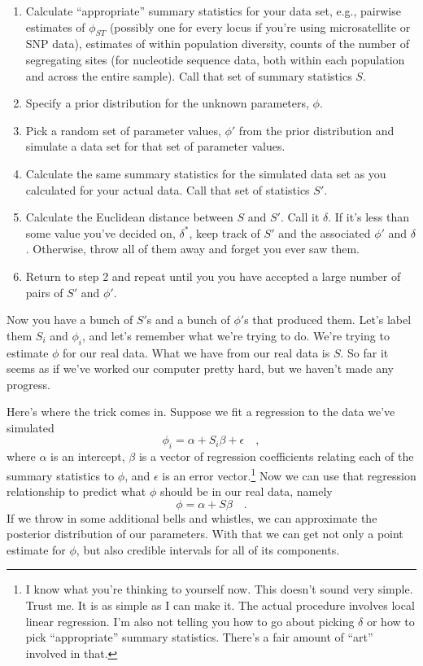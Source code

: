 \documentclass[12pt]{article}
\begin{document}
\begin{enumerate}

\item Calculate ``appropriate'' summary statistics for your data set,
  e.g., pairwise estimates of $\phi_{ST}$ (possibly one for every
  locus if you're using microsatellite or SNP data), estimates of
  within population diversity, counts of the number of segregating
  sites (for nucleotide sequence data, both within each population and
  across the entire sample). Call that set of summary statistics $S$.

\item Specify a prior distribution for the unknown parameters, $\phi$.

\item Pick a random set of parameter values, $\phi'$ from the prior
  distribution and simulate a data set for that set of parameter
  values.

\item Calculate the same summary statistics for the simulated
  data set as you calculated for your actual data. Call that set of
  statistics $S'$. 

\item Calculate the Euclidean distance between $S$ and $S'$. Call it
  $\delta$. If it's less than some value you've decided on,
  $\delta^*$, keep track of $S'$ and the associated $\phi'$ and
  $\delta$. Otherwise, throw all of them away and forget you ever saw
  them.

\item Return to step 2 and repeat until you you have accepted a large
  number of pairs of $S'$ and $\phi'$.

\end{enumerate}

Now you have a bunch of $S'$s and a bunch of $\phi'$s that produced
them. Let's label them $S_i$ and $\phi_i$, and let's remember what
we're trying to do. We're trying to estimate $\phi$ for our real
data. What we have from our real data is $S$. So far it seems as if
we've worked our computer pretty hard, but we haven't made any
progress. 

Here's where the trick comes in. Suppose we fit a regression to the
data we've simulated
\[
\phi_i = \alpha + S_i\beta + \epsilon \quad ,
\]
where $\alpha$ is an intercept, $\beta$ is a vector of regression
coefficients relating each of the summary statistics to $\phi$, and
$\epsilon$ is an error vector.\footnote{I know what you're thinking to
  yourself now. This doesn't sound very simple. Trust me. It is as
  simple as I can make it. The actual procedure involves local linear
  regression. I'm also not telling you how to go about picking
  $\delta$ or how to pick ``appropriate'' summary statistics. There's
  a fair amount of ``art'' involved in that.} Now we can use that
regression relationship to predict what $\phi$ should be in our real
data, namely
\[
\phi = \alpha + S\beta \quad .
\]
If we throw in some additional bells and whistles, we can approximate
the posterior distribution of our parameters. With that we can get not
only a point estimate for $\phi$, but also credible intervals for all
of its components.
\end{document}
